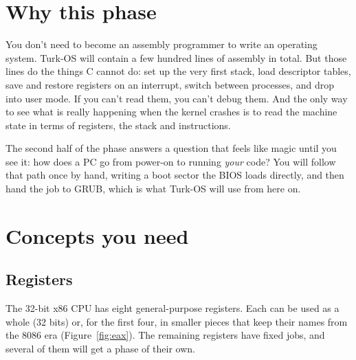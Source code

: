 \documentclass[11pt,a4paper]{article}
\begin{document}


\section{Why this phase}

You don't need to become an assembly programmer to write an operating system. Turk-OS will contain a few hundred
lines of assembly in total. But those lines do the things C cannot do: set up the very first stack, load descriptor
tables, save and restore registers on an interrupt, switch between processes, and drop into user mode. If you can't
read them, you can't debug them. And the only way to see what is really happening when the kernel crashes is to
read the machine state in terms of registers, the stack and instructions.

The second half of the phase answers a question that feels like magic until you see it: how does a PC go from
power-on to running \emph{your} code? You will follow that path once by hand, writing a boot sector the BIOS loads
directly, and then hand the job to GRUB, which is what Turk-OS will use from here on.

\section{Concepts you need}

\subsection{Registers}

The 32-bit x86 CPU has eight general-purpose registers. Each can be used as a whole (32 bits) or, for the first
four, in smaller pieces that keep their names from the 8086 era (Figure~\ref{fig:eax}). The remaining registers
have fixed jobs, and several of them will get a phase of their own.
\end{document}
